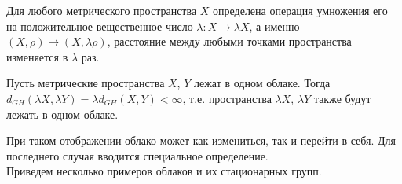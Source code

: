  	 Для любого метрического пространства $X$ определена операция умножения его
на положительное вещественное число $\lambda\colon X\mapsto \lambda X$, а именно
$(X, \rho) \mapsto (X, \lambda \rho)$, расстояние между любыми точками
пространства изменяется в $\lambda$ раз.
 	 \begin{remark} Пусть метрические пространства $X$, $Y$ лежат в одном
облаке. Тогда $d_{GH}(\lambda X, \lambda Y) = \lambda d_{GH}(X,Y) < \infty$,
т.е. пространства $\lambda X$, $\lambda Y$ также будут лежать в одном облаке.
 	 \end{remark}  
При таком отображении облако может как измениться, так и перейти в себя. Для последнего случая вводится специальное определение.
\\
\noindent
Приведем несколько примеров облаков и их стационарных групп.
 	 
